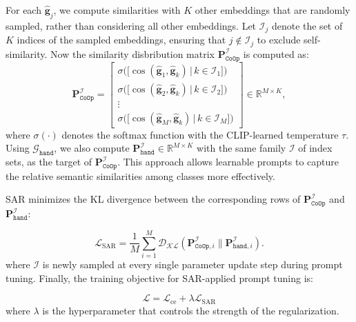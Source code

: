  For each $\hat{\boldsymbol{g}}_j$, we compute similarities with $K$ other embeddings that are randomly sampled, rather than considering all other embeddings. Let $\mathcal{I}_j$ denote the set of $K$ indices of the sampled embeddings, ensuring that $j \notin \mathcal{I}_j$ to exclude self-similarity. Now the similarity disbribution matrix $\mathbf{P}_{\mathtt{CoOp}}^{\mathcal{I}}$ is computed as:
\renewcommand{\arraystretch}{1.5}
\begin{equation}
\mathbf{P}_{\mathtt{CoOp}}^{\mathcal{I}} = 
\begin{bmatrix}
\sigma\Big(\big[\cos(\hat{\boldsymbol{g}}_1, \hat{\boldsymbol{g}}_k) \,|\, k \in \mathcal{I}_1\big]\Big) \\
\sigma\Big(\big[\cos(\hat{\boldsymbol{g}}_2, \hat{\boldsymbol{g}}_k) \,|\, k \in \mathcal{I}_2\big]\Big) \\
\vdots \\
\sigma\Big(\big[\cos(\hat{\boldsymbol{g}}_M, \hat{\boldsymbol{g}}_k) \,|\, k \in \mathcal{I}_M\big]\Big)
\end{bmatrix}
\in \mathbb{R}^{M \times K},
\end{equation}
where $\sigma(\cdot)$ denotes the softmax function with the CLIP-learned temperature $\tau$. Using $\mathcal{G}_{\mathtt{hand}}$, we also compute $\mathbf{P}_{\mathtt{hand}}^{\mathcal{I}} \in \mathbb{R}^{M \times K}$ with the same family $\mathcal{I}$ of index sets, as the target of $\mathbf{P}_{\mathtt{CoOp}}^{\mathcal{I}}$. This approach allows learnable prompts to capture the relative semantic similarities among classes more effectively.

 SAR minimizes the KL divergence between the corresponding rows of $\mathbf{P}^{\mathcal{I}}_{\mathtt{CoOp}}$ and $\mathbf{P}^{\mathcal{I}}_{\mathtt{hand}}$:

\begin{equation}
\mathcal{L}_{\text{SAR}} = \frac{1}{M} \sum_{i=1}^M \mathcal{D}_{\mathcal{KL}}(\mathbf{P}^{\mathcal{I}}_{\mathtt{CoOp},i} \parallel \mathbf{P}^{\mathcal{I}}_{\mathtt{hand},i}).
\end{equation}
where $\mathcal{I}$ is newly sampled at every single parameter update step during prompt tuning.
Finally, the training objective for SAR-applied prompt tuning is:

\begin{equation}
\mathcal{L}=\mathcal{L}_{\text{ce}}+\lambda \mathcal{L}_{\text{SAR}}
\end{equation}
where $\lambda$ is the hyperparameter that controls the strength of the regularization.